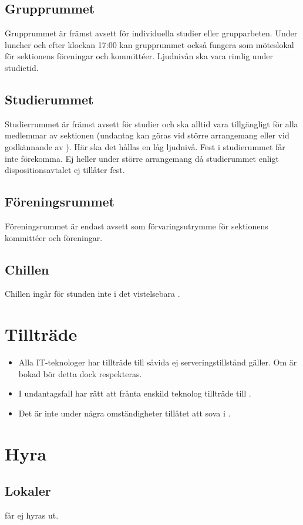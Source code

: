 \documentclass[11pt, includeaddress]{../../classes/cthit}
\begin{document}
\subsection{Grupprummet}
Grupprummet är främst avsett för individuella studier eller grupparbeten. Under luncher och efter klockan 17:00 kan grupprummet också fungera som möteslokal för sektionens föreningar och kommittéer. Ljudnivån ska vara rimlig under studietid.

\subsection{Studierummet}
Studierrummet är främst avsett för studier och ska alltid vara tillgängligt för alla medlemmar av sektionen (undantag kan göras vid större arrangemang eller vid godkännande av \STYRIT). Här ska det hållas en låg ljudnivå. Fest i studierummet får inte förekomma. Ej heller under större arrangemang då studierummet enligt dispositionsavtalet ej tillåter fest.

\subsection{Föreningsrummet}
Föreningsrummet är endast avsett som förvaringsutrymme för sektionens kommittéer och föreningar.

\subsection{Chillen}
Chillen ingår för stunden inte i  det vistelsebara \HUBBEN.


\section{Tillträde}
\begin{itemize}
	\item Alla IT-teknologer har tillträde till \HUBBEN såvida ej serveringstillstånd gäller. Om \HUBBEN är bokad bör detta dock respekteras.
	\item I undantagsfall har \STYRIT rätt att frånta enskild teknolog tillträde till \HUBBEN.
	\item Det är inte under några omständigheter tillåtet att sova i \HUBBEN.
\end{itemize}


\section{Hyra}
\subsection{Lokaler}
\HUBBEN får ej hyras ut.
\end{document}
